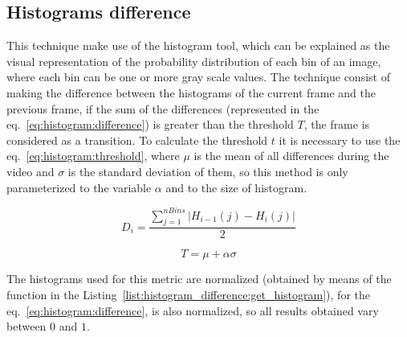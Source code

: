 \documentclass[journal]{IEEEtran}
\begin{document}
\subsection{Histograms difference}
This technique make use of the histogram tool, which can be explained as the visual representation of the probability distribution of each bin of an image, where each bin can be one or more gray scale values. The technique consist of making the difference between the histograms of the current frame and the previous frame, if the sum of the differences (represented in the eq.~\ref{eq:histogram:difference}) is greater than the threshold $T$, the frame is considered as a transition. To calculate the threshold $t$ it is necessary to use the eq.~\ref{eq:histogram:threshold}, where $\mu$ is the mean of all differences during the video and $\sigma$  is the standard deviation of them, so this method is only parameterized to the variable $\alpha$ and to the size of histogram.


\begin{equation}
\label{eq:histogram:difference}
D_{i} = \frac{\sum_{j=1}^{nBins} | H_{i-1}(j) - H_{i}(j) |}{2}
\end{equation}

\begin{equation}
\label{eq:histogram:threshold}
T = \mu + \alpha\sigma
\end{equation}

The histograms used for this metric are normalized (obtained by means of the function in the Listing~\ref{list:histogram_difference:get_histogram}), for the eq.~\ref{eq:histogram:difference}, is also normalized, so all results obtained vary between $0$ and $1$.
\end{document}
